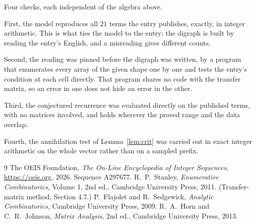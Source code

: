 \documentclass[11pt,a4paper]{article}
\theoremstyle{plain}
\theoremstyle{definition}
\begin{document}
Four checks, each independent of the algebra above.

First, the model reproduces all $21$ terms the entry publishes, exactly, in integer
arithmetic. This is what ties the model to the entry: the digraph is built by reading the
entry's English, and a misreading gives different counts.

Second, the reading was pinned before the digraph was written, by a program that enumerates
every array of the given shape one by one and tests the entry's condition at each cell
directly. That program shares no code with the transfer matrix, so an error in one does not
hide an error in the other.

Third, the conjectured recurrence was evaluated directly on the published terms, with no
matrices involved, and holds wherever the proved range and the data overlap.

Fourth, the annihilation test of Lemma~\ref{lem:crit} was carried out in exact integer
arithmetic on the whole vector rather than on a sampled prefix.

\begin{thebibliography}{9}
 The OEIS Foundation, \emph{The On-Line Encyclopedia of Integer
Sequences}, \url{https://oeis.org}, 2026. Sequence A297677.
 R.~P.~Stanley, \emph{Enumerative Combinatorics}, Volume 1, 2nd ed.,
Cambridge University Press, 2011. (Transfer-matrix method, Section 4.7.)
 P.~Flajolet and R.~Sedgewick, \emph{Analytic Combinatorics}, Cambridge
University Press, 2009.
 R.~A.~Horn and C.~R.~Johnson, \emph{Matrix Analysis}, 2nd ed., Cambridge
University Press, 2013.
\end{thebibliography}
\end{document}
